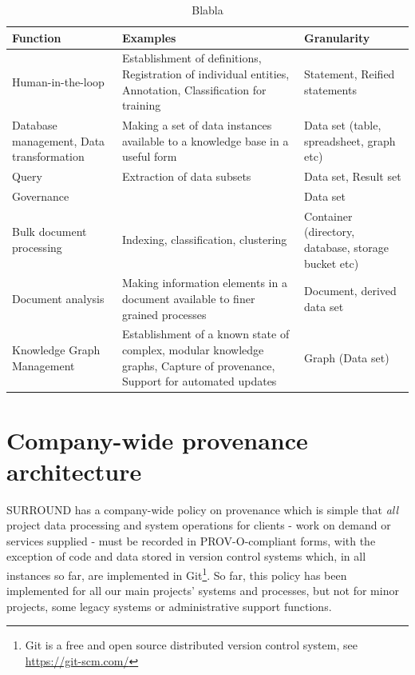 \documentclass[letterpaper,twocolumn,10pt]{article}
\begin{document}
\begin{table}[t]
  \centering
  \begin{tabular}{|p{5cm}|p{5cm}|p{5cm}|}
    \hline
    \textbf{Function} & \textbf{Examples} & \textbf{Granularity}\\
    \hline
    Human-in-the-loop & Establishment of definitions, Registration of individual entities, Annotation, Classification for training & Statement, Reified statements\\ 
    \hline
    Database management, Data transformation & Making a set of data instances available to a knowledge base in a useful form & Data set (table, spreadsheet, graph etc)\\ 
    \hline
    Query & Extraction of data subsets & Data set, Result set\\
    Governance & & Data set\\
    \hline
    Bulk document processing & Indexing, classification, clustering & Container (directory, database, storage bucket etc)\\
    \hline
    Document analysis & Making information elements in a document available to finer grained processes & Document, derived data set\\
    \hline
    Knowledge Graph Management & Establishment of a known state of complex, modular knowledge graphs, Capture of provenance, Support for automated updates & Graph (Data set)\\
    \hline
  \end{tabular}
  \caption{Blabla}
  \label{tab:1}
\end{table}



\section{Company-wide provenance architecture}
SURROUND has a company-wide policy on provenance which is simple that \textit{all} project data processing 
and system operations for clients - work on demand or services supplied - must be recorded in 
PROV-O-compliant forms, with the exception of code and data stored in version control systems which, in all 
instances so far, are implemented in Git\footnote{Git is a free and open source distributed version control 
system, see \url{https://git-scm.com/}}. So far, this policy has been implemented for all our main projects' 
systems and processes, but not for minor projects, some legacy systems or administrative support functions.
\end{document}
